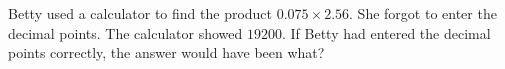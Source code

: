 Betty used a calculator to find the product $0.075 \times 2.56$. She forgot to enter the decimal points. The calculator showed $19200$. If Betty had entered the decimal points correctly, the answer would have been what?

